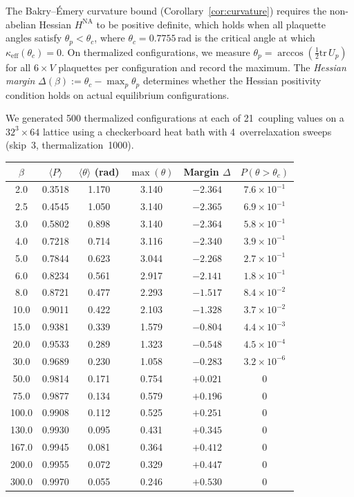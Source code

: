 \documentclass[11pt]{article}
\theoremstyle{definition}
\newcommand{\tr}{\mathrm{tr}}
\begin{document}
The Bakry--\'Emery curvature bound
(Corollary~\ref{cor:curvature}) requires the non-abelian
Hessian $H^{\mathrm{NA}}$ to be positive definite, which holds
when all plaquette angles satisfy $\theta_p<\theta_c$, where
$\theta_c=0.7755$\,rad is the critical angle at which
$\kappa_{\mathrm{eff}}(\theta_c)=0$.  On thermalized
configurations, we measure $\theta_p=\arccos(\tfrac{1}{2}\tr\,U_p)$
for all $6\times V$ plaquettes per configuration and record the
maximum.  The \emph{Hessian margin}
$\Delta(\beta):=\theta_c-\max_p\theta_p$
determines whether the Hessian positivity condition holds
on actual equilibrium configurations.

We generated 500 thermalized configurations at each of 21~coupling
values on a $32^3\times 64$ lattice using a checkerboard heat bath
with 4~overrelaxation sweeps (skip~3, thermalization~1000).

\begin{center}
\begin{tabular}{cccccc}
\toprule
$\beta$ & $\langle P\rangle$ & $\langle\theta\rangle$ (rad) &
$\max(\theta)$ & Margin $\Delta$ & $P(\theta>\theta_c)$\\
\midrule
2.0 & 0.3518 & 1.170 & 3.140 & $-2.364$ & $7.6\times 10^{-1}$\\
2.5 & 0.4545 & 1.050 & 3.140 & $-2.365$ & $6.9\times 10^{-1}$\\
3.0 & 0.5802 & 0.898 & 3.140 & $-2.364$ & $5.8\times 10^{-1}$\\
4.0 & 0.7218 & 0.714 & 3.116 & $-2.340$ & $3.9\times 10^{-1}$\\
5.0 & 0.7844 & 0.623 & 3.044 & $-2.268$ & $2.7\times 10^{-1}$\\
6.0 & 0.8234 & 0.561 & 2.917 & $-2.141$ & $1.8\times 10^{-1}$\\
8.0 & 0.8721 & 0.477 & 2.293 & $-1.517$ & $8.4\times 10^{-2}$\\
10.0 & 0.9011 & 0.422 & 2.103 & $-1.328$ & $3.7\times 10^{-2}$\\
15.0 & 0.9381 & 0.339 & 1.579 & $-0.804$ & $4.4\times 10^{-3}$\\
20.0 & 0.9533 & 0.289 & 1.323 & $-0.548$ & $4.5\times 10^{-4}$\\
30.0 & 0.9689 & 0.230 & 1.058 & $-0.283$ & $3.2\times 10^{-6}$\\
50.0 & 0.9814 & 0.171 & 0.754 & $+0.021$ & $0$\\
75.0 & 0.9877 & 0.134 & 0.579 & $+0.196$ & $0$\\
100.0 & 0.9908 & 0.112 & 0.525 & $+0.251$ & $0$\\
130.0 & 0.9930 & 0.095 & 0.431 & $+0.345$ & $0$\\
167.0 & 0.9945 & 0.081 & 0.364 & $+0.412$ & $0$\\
200.0 & 0.9955 & 0.072 & 0.329 & $+0.447$ & $0$\\
300.0 & 0.9970 & 0.055 & 0.246 & $+0.530$ & $0$\\
\bottomrule
\end{tabular}
\end{center}
\end{document}
